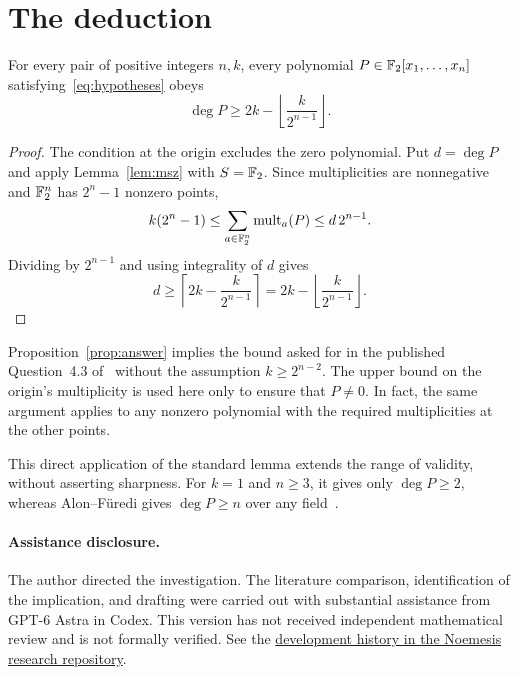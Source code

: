 \section{The deduction}

\begin{proposition}\label{prop:answer}
For every pair of positive integers \(n,k\), every polynomial
\(P\in\mathbb F_2[x_1,\ldots,x_n]\) satisfying~\eqref{eq:hypotheses}
obeys
\[
 \deg P\ge 2k-\left\lfloor\frac{k}{2^{n-1}}\right\rfloor.
\]
\end{proposition}

\begin{proof}
The condition at the origin excludes the zero polynomial. Put
\(d=\deg P\) and apply Lemma~\ref{lem:msz} with \(S=\mathbb F_2\).
Since multiplicities are nonnegative and \(\mathbb F_2^n\) has \(2^n-1\)
nonzero points,
\[
 k(2^n-1)
 \le \sum_{a\in\mathbb F_2^n}\operatorname{mult}_a(P)
 \le d\,2^{n-1}.
\]
Dividing by \(2^{n-1}\) and using integrality of \(d\) gives
\[
 d\ge\left\lceil 2k-\frac{k}{2^{n-1}}\right\rceil
   =2k-\left\lfloor\frac{k}{2^{n-1}}\right\rfloor.
\]
\end{proof}

Proposition~\ref{prop:answer} implies the bound asked for in the published
Question~4.3 of~\cite{BBDM23} without the assumption \(k\ge2^{n-2}\).
The upper bound on the origin's multiplicity is used here only to
ensure that \(P\ne0\). In fact, the same argument applies to any nonzero
polynomial with the required multiplicities at the other points.

This direct application of the standard lemma extends the range of
validity, without asserting sharpness. For \(k=1\) and \(n\ge3\), it gives
only \(\deg P\ge2\), whereas Alon--F\"uredi gives \(\deg P\ge n\)
over any field~\cite[Theorem~5]{AF93}.

\paragraph{Assistance disclosure.}
The author directed the investigation. The literature comparison,
identification of the implication, and drafting were carried out with
substantial assistance from GPT-6 Astra in Codex. This version has not
received independent mathematical review and is not formally verified.
See the \href{https://github.com/kbr-/math-research/blob/main/publications/binary-polynomial-multiplicity/DEVELOPMENT_HISTORY.md}{development history in the Noemesis research repository}.
